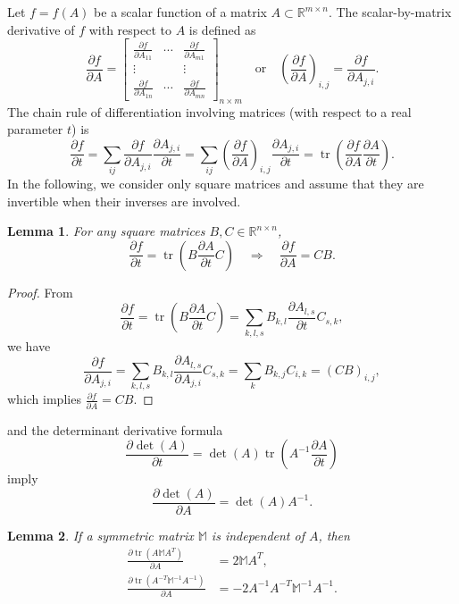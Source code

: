 \documentclass[american]{scrartcl}
\providecommand{\p}[2]{\frac{\partial{}#1}{\partial{}#2}}
\providecommand{\M}{\mathbb{M}}
\providecommand{\R}{\mathbb{R}}
\newtheorem{lemma}{\hspace{1ex}Lemma}[section]
\theoremstyle{remark}
\begin{document}
Let $f = f(A)$ be a scalar function of a matrix $A \subset \R^{m\times n}$.
The scalar-by-matrix derivative of $f$ with respect to $A$ is defined as
\[
   \p{f}{A} 
      = \begin{bmatrix} 
         \p{f}{A_{11}}  & \cdots & \p{f}{A_{m1}} \\
         \vdots         &        & \vdots \\
         \p{f}{A_{1 n}} & \cdots & \p{f}{A_{m n}}
      \end{bmatrix}_{n\times m}
   \quad \text{or} \quad 
   {\left(\p{f}{A} \right)}_{i,j} = \p{f}{A_{j,i}}
   .
\]
The chain rule of differentiation involving matrices (with respect to a real parameter $t$) is
\[
   \p{f}{t} 
      = \sum_{ij} \p{f}{A_{j,i}} \p{A_{j,i}}{t}
      = \sum_{ij} {\left( \p{f}{A} \right)}_{i,j} \p{A_{j,i}}{t}
      = \operatorname{tr} \left( \p{f}{A} \p{A}{t} \right)
      .
\]
In the following, we consider only square matrices and assume that they are invertible when their inverses are involved.

\begin{lemma}
\label{lem:diff:6}
For any square matrices $B, C \in \R^{n \times n}$,
\begin{equation}
   \p{f}{t} = \operatorname{tr}\left( B \p{A}{t} C \right)
   \quad \Longrightarrow \quad
   \p{f}{A} = C B
   .
   \label{eq:diff:6}
\end{equation}
\end{lemma}

\begin{proof}
From
\[
   \p{f}{t} 
      = \operatorname{tr}\left(B \p{A}{t} C \right)
      = \sum_{k, l, s} B_{k,l} \p{A_{l,s}}{t} C_{s, k},
\]
we have
\[
   \p{f}{A_{j,i}}
      = \sum_{k, l, s} B_{k,l} \p{A_{l,s}}{A_{j,i}} C_{s, k} 
      = \sum_{k} B_{k,j} C_{i, k} 
      = {(CB)}_{i,j}
      ,
\]
which implies $\p{f}{A} = C B$.
\end{proof}

 and the determinant derivative formula
\begin{equation}
   \p{\det(A)}{t} = \det(A) \operatorname{tr}\left( A^{-1} \p{A}{t} \right)
   \label{eq:det:1}
\end{equation}
imply
\begin{equation}
   \p{\det(A)}{A} = \det(A) A^{-1} .
   \label{eq:det:2}
\end{equation}

\begin{lemma}
\label{lem:diff:5}
If a symmetric matrix $\M$ is independent of $A$, then
\begin{align}
   \p{\operatorname{tr}(A \M A^T)}{A} 
      &= 2 \M A^T ,
   \label{eq:diff:5}
   \\
   \p{\operatorname{tr}(A^{-T} \M^{-1} A^{-1})}{A} 
      &= - 2 A^{-1} A^{-T} \M^{-1} A^{-1}
   .
   \label{eq:diff:7}
\end{align}
\end{lemma}
\end{document}

